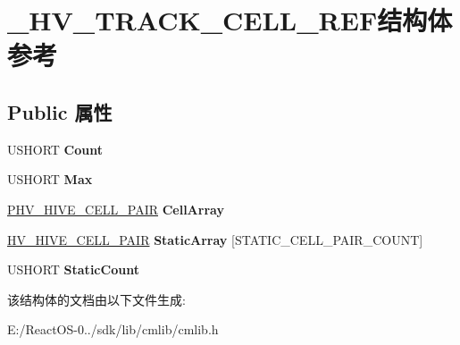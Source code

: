 \hypertarget{struct___h_v___t_r_a_c_k___c_e_l_l___r_e_f}{}\section{\+\_\+\+H\+V\+\_\+\+T\+R\+A\+C\+K\+\_\+\+C\+E\+L\+L\+\_\+\+R\+E\+F结构体 参考}
\label{struct___h_v___t_r_a_c_k___c_e_l_l___r_e_f}
\subsection*{Public 属性}
\begin{DoxyCompactItemize}
\item 
\mbox{\label{struct___h_v___t_r_a_c_k___c_e_l_l___r_e_f_abc2b95290e929af20a499f82901f2e8e}} 
U\+S\+H\+O\+RT {\bfseries Count}
\item 
\mbox{\label{struct___h_v___t_r_a_c_k___c_e_l_l___r_e_f_a96b054a851163f2c88b95eec325129bb}} 
U\+S\+H\+O\+RT {\bfseries Max}
\item 
\mbox{\label{struct___h_v___t_r_a_c_k___c_e_l_l___r_e_f_a3e3ff18ea8eb9aa46832efadabdd7e22}} 
\hyperlink{struct___h_v___h_i_v_e___c_e_l_l___p_a_i_r}{P\+H\+V\+\_\+\+H\+I\+V\+E\+\_\+\+C\+E\+L\+L\+\_\+\+P\+A\+IR} {\bfseries Cell\+Array}
\item 
\mbox{\label{struct___h_v___t_r_a_c_k___c_e_l_l___r_e_f_a71ae8bed9a5c4154f15c9f02f5cdb94e}} 
\hyperlink{struct___h_v___h_i_v_e___c_e_l_l___p_a_i_r}{H\+V\+\_\+\+H\+I\+V\+E\+\_\+\+C\+E\+L\+L\+\_\+\+P\+A\+IR} {\bfseries Static\+Array} \mbox{[}S\+T\+A\+T\+I\+C\+\_\+\+C\+E\+L\+L\+\_\+\+P\+A\+I\+R\+\_\+\+C\+O\+U\+NT\mbox{]}
\item 
\mbox{\label{struct___h_v___t_r_a_c_k___c_e_l_l___r_e_f_ae6bd4df5ec4408e51db502a694f115b0}} 
U\+S\+H\+O\+RT {\bfseries Static\+Count}
\end{DoxyCompactItemize}


该结构体的文档由以下文件生成\+:\begin{DoxyCompactItemize}
\item 
E\+:/\+React\+O\+S-\/0../sdk/lib/cmlib/cmlib.\+h\end{DoxyCompactItemize}

